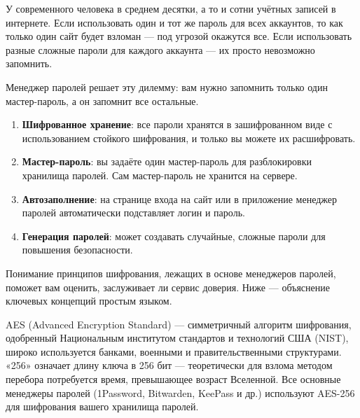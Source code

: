 


У современного человека в среднем десятки, а то и сотни учётных записей в интернете. Если использовать один и тот же пароль для всех аккаунтов, то как только один сайт будет взломан — под угрозой окажутся все. Если использовать разные сложные пароли для каждого аккаунта — их просто невозможно запомнить.

Менеджер паролей решает эту дилемму: вам нужно запомнить только один мастер-пароль, а он запомнит все остальные.


\begin{enumerate}
  \item \textbf{Шифрованное хранение}: все пароли хранятся в зашифрованном виде с использованием стойкого шифрования, и только вы можете их расшифровать.
  \item \textbf{Мастер-пароль}: вы задаёте один мастер-пароль для разблокировки хранилища паролей. Сам мастер-пароль не хранится на сервере.
  \item \textbf{Автозаполнение}: на странице входа на сайт или в приложение менеджер паролей автоматически подставляет логин и пароль.
  \item \textbf{Генерация паролей}: может создавать случайные, сложные пароли для повышения безопасности.
\end{enumerate}


Понимание принципов шифрования, лежащих в основе менеджеров паролей, поможет вам оценить, заслуживает ли сервис доверия. Ниже — объяснение ключевых концепций простым языком.


AES (Advanced Encryption Standard) — симметричный алгоритм шифрования, одобренный Национальным институтом стандартов и технологий США (NIST), широко используется банками, военными и правительственными структурами. «256» означает длину ключа в 256 бит — теоретически для взлома методом перебора потребуется время, превышающее возраст Вселенной. Все основные менеджеры паролей (1Password, Bitwarden, KeePass и др.) используют AES-256 для шифрования вашего хранилища паролей.

